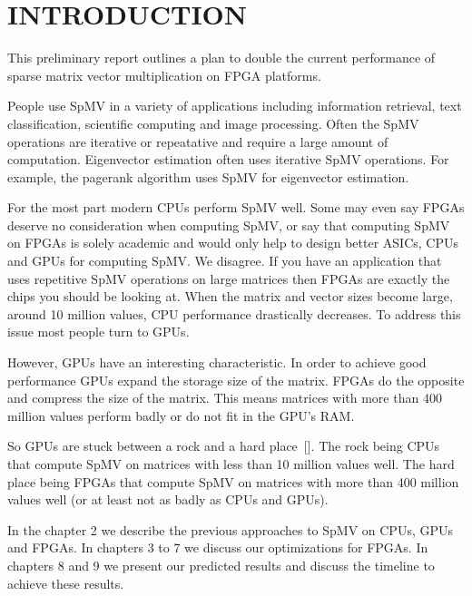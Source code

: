 \chapter{INTRODUCTION}
This preliminary report outlines a plan to double the current performance of sparse matrix vector multiplication on FPGA platforms.
\par People use SpMV in a variety of applications including information retrieval, text classification, scientific computing and image processing. Often the SpMV operations are iterative or repeatative and require a large amount of computation. Eigenvector estimation often uses iterative SpMV operations. For example, the pagerank algorithm uses SpMV for eigenvector estimation.
\par For the most part modern CPUs perform SpMV well. Some may even say FPGAs deserve no consideration when computing SpMV, or say that computing SpMV on FPGAs is solely academic and would only help to design better ASICs, CPUs and GPUs for computing SpMV. We disagree. If you have  an application that uses repetitive SpMV operations on large matrices then FPGAs are exactly the chips you should be looking at. When the matrix and vector sizes  become large, around 10 million values, CPU performance drastically decreases. To address this issue most people turn to GPUs.
\par However, GPUs have an interesting characteristic. In order to achieve good performance GPUs expand the storage size of the matrix. FPGAs do the opposite and compress the size of the matrix. This means matrices with more than 400 million values perform badly or do not fit in the GPU's RAM.
\par So GPUs are stuck between a rock and a hard place~[\cite{prelim:davis0}]. The rock being CPUs that compute SpMV on matrices with less than 10 million values well. The hard place being FPGAs that compute SpMV on matrices with more than 400 million values well (or at least not as badly as CPUs and GPUs).
\par In the chapter 2 we describe the previous approaches to SpMV on CPUs, GPUs and FPGAs. In chapters 3 to 7 we discuss our optimizations for FPGAs. In chapters 8 and 9 we present our predicted results and discuss the timeline to achieve these results.
